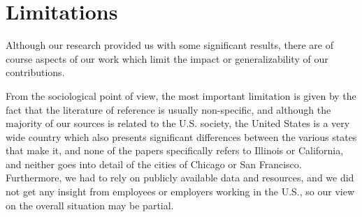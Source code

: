 \section{Limitations}
\label{section:limitations}
Although our research provided us with some significant results, there are of course aspects of our work which limit the impact or generalizability of our contributions.

From the sociological point of view, the most important limitation is given by the fact that the literature of reference is usually non-specific, and although the majority of our sources is related to the U.S. society, the United States is a very wide country which also presents significant differences between the various states that make it, and none of the papers specifically refers to Illinois or California, and neither goes into detail of the cities of Chicago or San Francisco. Furthermore, we had to rely on publicly available data and resources, and we did not get any insight from employees or employers working in the U.S., so our view on the overall situation may be partial.

